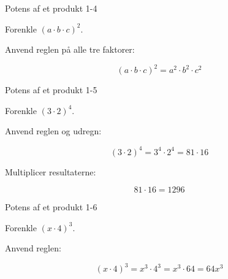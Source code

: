 \documentclass{article}
\begin{document}
\newpage

\begin{exercise}{Potens af et produkt 1-4}

Forenkle $(a \cdot b \cdot c)^2$.


\hint

Anvend reglen på alle tre faktorer:

\hint
\[
(a \cdot b \cdot c)^2 = a^2 \cdot b^2 \cdot c^2
\]

\end{exercise}

\newpage

\begin{exercise}{Potens af et produkt 1-5}

Forenkle $(3 \cdot 2)^4$.


\hint

Anvend reglen og udregn:

\hint
\[
(3 \cdot 2)^4 = 3^4 \cdot 2^4 = 81 \cdot 16
\]

\hint

Multiplicer resultaterne:

\hint
\[
81 \cdot 16 = 1296
\]

\end{exercise}

\newpage

\begin{exercise}{Potens af et produkt 1-6}

Forenkle $(x \cdot 4)^3$.


\hint

Anvend reglen:

\hint
\[
(x \cdot 4)^3 = x^3 \cdot 4^3 = x^3 \cdot 64 = 64x^3
\]

\end{exercise}
\end{document}
